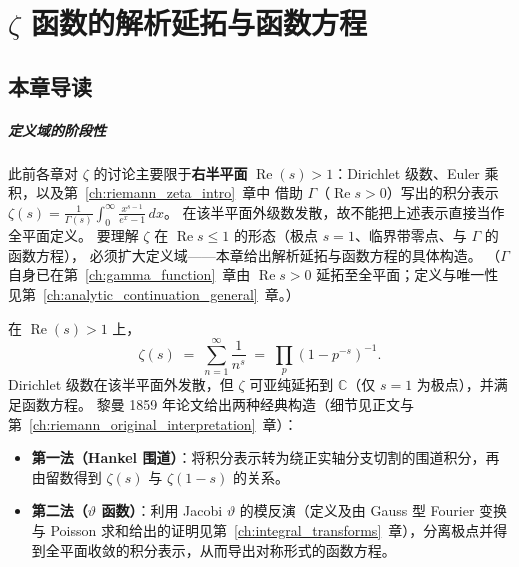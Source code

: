 
\chapter{\texorpdfstring{$\zeta$}{Zeta} 函数的解析延拓与函数方程}\label{ch:riemann_zeta_continuation}

\section{本章导读}

\paragraph{定义域的阶段性}
此前各章对 $\zeta$ 的讨论主要限于\textbf{右半平面}
$\operatorname{Re}(s)>1$：Dirichlet 级数、Euler 乘积，以及第~\ref{ch:riemann_zeta_intro}~章中
借助 $\Gamma$（$\operatorname{Re}s>0$）写出的积分表示
$\zeta(s)=\frac1{\Gamma(s)}\int_0^\infty\frac{x^{s-1}}{e^x-1}\,dx$。
在该半平面外级数发散，故不能把上述表示直接当作全平面定义。
要理解 $\zeta$ 在 $\operatorname{Re}s\le 1$ 的形态（极点 $s=1$、临界带零点、与 $\Gamma$ 的函数方程），
必须扩大定义域——本章给出解析延拓与函数方程的具体构造。
（$\Gamma$ 自身已在第~\ref{ch:gamma_function}~章由 $\operatorname{Re}s>0$ 延拓至全平面；定义与唯一性见第~\ref{ch:analytic_continuation_general}~章。）

在 $\operatorname{Re}(s)>1$ 上，
\[
  \zeta(s) \;=\; \sum_{n=1}^{\infty} \frac{1}{n^s} \;=\; \prod_{p} \left(1 - p^{-s}\right)^{-1}.
\]
Dirichlet 级数在该半平面外发散，但 $\zeta$ 可亚纯延拓到 $\mathbb{C}$（仅 $s=1$ 为极点），并满足函数方程。
黎曼 1859 年论文给出两种经典构造（细节见正文与第~\ref{ch:riemann_original_interpretation}~章）：
\begin{itemize}
    \item \textbf{第一法（Hankel 围道）}：将积分表示转为绕正实轴分支切割的围道积分，再由留数得到 $\zeta(s)$ 与 $\zeta(1-s)$ 的关系。
    \item \textbf{第二法（$\vartheta$ 函数）}：利用 Jacobi $\vartheta$ 的模反演（定义及由 Gauss 型 Fourier 变换与 Poisson 求和给出的证明见第~\ref{ch:integral_transforms}~章），分离极点并得到全平面收敛的积分表示，从而导出对称形式的函数方程。
\end{itemize}

